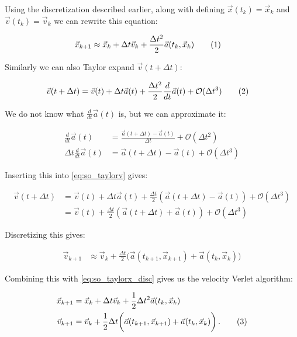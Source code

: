 \documentclass[reprint,english,notitlepage]{revtex4-1}  %
\newcommand\numberthis{\addtocounter{equation}{1}\tag{\theequation}}
\begin{document}
Using the discretization described earlier, along with defining $\vec{x}(t_k) = \vec{x}_k$ and $\vec{v}(t_k) = \vec{v}_k$ we can rewrite this equation:

\begin{align*}
\vec{x}_{k + 1} &\approx \vec{x}_k + \Delta t \vec{v}_k + \frac{\Delta t^2}{2} \vec{a}(t_k,\vec{x}_k) \numberthis \label{eq:so_taylorx_disc}
\end{align*}

Similarly we can also Taylor expand $\vec{v}(t+\Delta t)$:

\begin{align*}
\vec{v}(t+\Delta t) &= \vec{v}(t) + \Delta t \vec{a}(t) + \frac{\Delta t^2}{2} \frac{d}{dt} \vec{a}(t) + \mathcal{O}(\Delta t^3) \numberthis \label{eq:so_taylorv}
\end{align*}

We do not know what $\frac{d}{dt} \vec{a}(t)$ is, but we can approximate it:

\begin{align*}
\frac{d}{dt}\vec{a}(t) &= \frac{\vec{a}(t+\Delta t) - \vec{a}(t)}{\Delta t} + \mathcal{O}(\Delta t^2) \\
\Delta t \frac{d}{dt} \vec{a}(t) &= \vec{a}(t+ \Delta t ) - \vec{a}(t) + \mathcal{O}(\Delta t^3)
\end{align*}

Inserting this into \eqref{eq:so_taylorv} gives:

\begin{align*}
\vec{v}(t+\Delta t) &= \vec{v}(t) + \Delta t \vec{a}(t) + \frac{\Delta t}{2} (\vec{a}(t+ \Delta t ) - \vec{a}(t)) + \mathcal{O}(\Delta t^3) \\
&= \vec{v}(t) + \frac{\Delta t}{2} (\vec{a}(t+ \Delta t ) + \vec{a}(t)) +  \mathcal{O}(\Delta t^3)
\end{align*}

Discretizing this gives:

\begin{align*}
\vec{v}_{k+1} &\approx \vec{v}_k + \frac{\Delta t}{2} \bigg( \vec{a}(t_{k+1}, \vec{x}_{k+1}) + \vec{a}(t_k, \vec{x}_k) \bigg)
\end{align*}

Combining this with \eqref{eq:so_taylorx_disc} gives us the velocity Verlet algorithm:

\begin{align*}
\vec{x}_{k+1} &= \vec{x}_k + \Delta t \vec{v}_k + \frac{1}{2} \Delta t^2 \vec{a}(t_k,\vec{x}_k) \\
\vec{v}_{k+1} &= \vec{v}_k + \frac{1}{2}\Delta t \bigg( \vec{a}(t_{k+1},\vec{x}_{k+1}) + \vec{a}(t_k, \vec{x}_k) \bigg) \, . \numberthis \label{eq:VelocityVerlet}
\end{align*}
\end{document}
